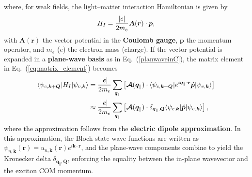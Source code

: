 where, for weak fields, the  light--matter interaction Hamiltonian is given by~\cite{peng2022tailoring, sanchez2024enhanced}
\[
H_I=\frac{|e|}{2m_e}\boldsymbol{A}(\boldsymbol{r})\cdot\boldsymbol{p},
\]
with $\boldsymbol{A}(\boldsymbol{r})$ the vector potential in the \textbf{Coulomb gauge}, $\boldsymbol{p}$ the momentum operator, and $m_e$ ($e$) the electron mass (charge).
If the vector potential is expanded in a \textbf{plane-wave basis} as in Eq.~(\ref{planwaveinC}), the matrix element in Eq.~(\ref{eq:matrix_element}) becomes
\begin{equation}
\color{G} 
\begin{aligned}
\langle\psi_{c, \boldsymbol{k}+\boldsymbol{Q}}|H_I|\psi_{v, \boldsymbol{k}}\rangle
&= \frac{|e|}{2m_e} 
\sum_{\boldsymbol{q}_\parallel} 
\left[ 
\boldsymbol{\mathcal{A}}(\boldsymbol{q}_\parallel)  \cdot
\langle\psi_{c, \boldsymbol{k}+\boldsymbol{Q}}|
e^{i\boldsymbol{q}_\parallel \cdot \boldsymbol{r}} 
\hat{\boldsymbol{p}} 
|\psi_{v, \boldsymbol{k}}\rangle
\right] \\
&\approx \frac{|e|}{2m_e} 
\sum_{\boldsymbol{q}_\parallel} 
\left[
\boldsymbol{\mathcal{A}}(\boldsymbol{q}_\parallel)  \cdot
\delta_{\boldsymbol{q}_\parallel,\boldsymbol{Q}} 
\langle\psi_{c, \boldsymbol{k}}| 
\hat{\boldsymbol{p}} 
|\psi_{v, \boldsymbol{k}}\rangle
\right],
\end{aligned}
\end{equation}
where the approximation follows from the \textbf{electric dipole approximation}. In this approximation, the Bloch state wave functions are written as $\psi_{n, \boldsymbol{k}}(\boldsymbol{r})=u_{n, \boldsymbol{k}}(\boldsymbol{r}) e^{i\boldsymbol{k}\cdot \boldsymbol{r}}$, and the plane-wave components combine to yield the Kronecker delta $\delta_{\boldsymbol{q}_\parallel,\boldsymbol{Q}}$, enforcing the equality between the in-plane wavevector and the exciton COM momentum.

